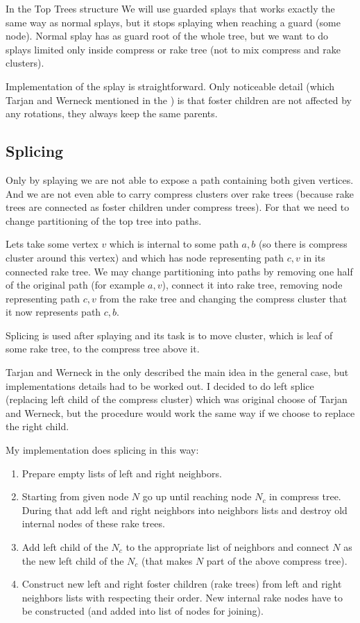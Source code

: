In the Top Trees structure We will use {\I guarded splays} that works exactly
the same way as normal splays, but it stops splaying when reaching a guard (some
node). Normal splay has as guard root of the whole tree, but we want to do
splays limited only inside compress or rake tree (not to mix compress and
rake clusters).

Implementation of the splay is straightforward. Only noticeable detail (which
Tarjan and Werneck mentioned in the \cite{SelfAdjustingTT}) is that foster
children are not affected by any rotations, they always keep the same parents.

\subsection{Splicing}

Only by splaying we are not able to expose a path containing both given
vertices. And we are not even able to carry compress clusters over rake trees
(because rake trees are connected as foster children under compress trees). For
that we need to change partitioning of the top tree into paths.

Lets take some vertex $v$ which is internal to some path $a,b$ (so there is
compress cluster around this vertex) and which has node representing path $c,v$
in its connected rake tree. We may change partitioning into paths by removing
one half of the original path (for example $a,v$), connect it into rake tree,
removing node representing path $c,v$ from the rake tree and changing the
compress cluster that it now represents path $c,b$.


Splicing is used after splaying and its task is to move cluster, which is leaf
of some rake tree, to the compress tree above it.

Tarjan and Werneck in the \cite{SelfAdjustingTT} only described the main idea in
the general case, but implementations details had to be worked out. I decided
to do {\I left splice} (replacing left child of the compress cluster) which was
original choose of Tarjan and Werneck, but the procedure would work the same
way if we choose to replace the right child.

My implementation does splicing in this way:
\begin{enumerate}
\item Prepare empty lists of left and right neighbors.
\item Starting from given node $N$ go up until reaching node $N_c$ in compress
tree. During that add left and right neighbors into neighbors lists and destroy
old internal nodes of these rake trees.
\item Add left child of the $N_c$ to the appropriate list of neighbors and
connect $N$ as the new left child of the $N_c$ (that makes $N$ part of the above
compress tree).
\item Construct new left and right foster children (rake trees) from left and
right neighbors lists with respecting their order. New internal rake nodes have
to be constructed (and added into list of nodes for joining).
\end{enumerate}

